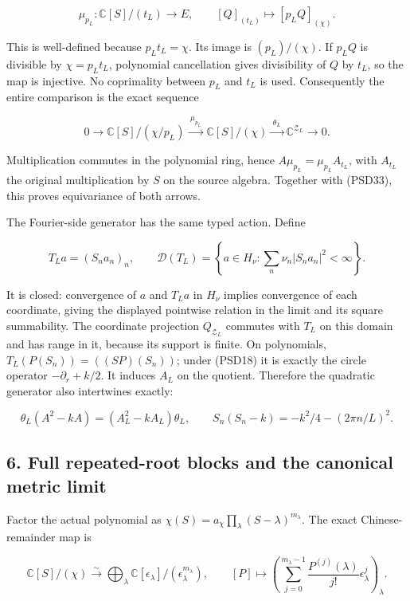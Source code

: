 \[
\mu_{p_L}:\mathbb{C}[S]/(t_L)\longrightarrow E,
\qquad [Q]_{(t_L)}\longmapsto[p_LQ]_{(\chi)}.
\tag{PSD33a}
\]

This is well-defined because \(p_L t_L=\chi\). Its image is \((p_L)/(\chi)\). If \(p_LQ\) is divisible by \(\chi=p_Lt_L\), polynomial cancellation gives divisibility of \(Q\) by \(t_L\), so the map is injective. No coprimality between \(p_L\) and \(t_L\) is used. Consequently the entire comparison is the exact sequence

\[
0\longrightarrow\mathbb{C}[S]/(\chi/p_L)
\xrightarrow{\;\mu_{p_L}\;}\mathbb{C}[S]/(\chi)
\xrightarrow{\;\theta_L\;}\mathbb{C}^{\mathcal Z_L}
\longrightarrow0.
\tag{PSD33b}
\]

Multiplication commutes in the polynomial ring, hence \(A\mu_{p_L}=\mu_{p_L}A_{t_L}\), with \(A_{t_L}\) the original multiplication by \(S\) on the source algebra. Together with (PSD33), this proves equivariance of both arrows.

The Fourier-side generator has the same typed action. Define

\[
T_La=(S_na_n)_n,\qquad
\mathcal D(T_L)=\left\{a\in H_\nu:\sum_n\nu_n|S_na_n|^2<\infty\right\}.
\tag{PSD33c}
\]

It is closed: convergence of \(a\) and \(T_La\) in \(H_\nu\) implies convergence of each coordinate, giving the displayed pointwise relation in the limit and its square summability. The coordinate projection \(Q_{\mathcal Z_L}\) commutes with \(T_L\) on this domain and has range in it, because its support is finite. On polynomials, \(T_L(P(S_n))=((SP)(S_n))\); under (PSD18) it is exactly the circle operator \(-\partial_r+k/2\). It induces \(A_L\) on the quotient. Therefore the quadratic generator also intertwines exactly:

\[
\theta_L(A^2-kA)=(A_L^2-kA_L)\theta_L,
\qquad S_n(S_n-k)=-k^2/4-(2\pi n/L)^2.
\tag{PSD33d}
\]

\subsection{6. Full repeated-root blocks and the canonical metric limit}\label{full-repeated-root-blocks-and-the-canonical-metric-limit}

Factor the actual polynomial as \(\chi(S)=a_\chi\prod_\lambda(S-\lambda)^{m_\lambda}\). The exact Chinese-remainder map is

\[
\mathbb{C}[S]/(\chi)\xrightarrow{\sim}
\bigoplus_\lambda\mathbb{C}[\epsilon_\lambda]/(\epsilon_\lambda^{m_\lambda}),
\qquad
[P]\longmapsto
\left(\sum_{j=0}^{m_\lambda-1}\frac{P^{(j)}(\lambda)}{j!}\epsilon_\lambda^j\right)_\lambda.
\tag{PSD34}
\]

